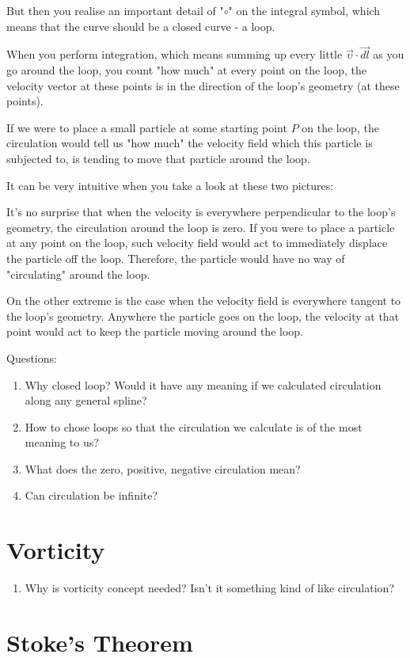 \documentclass[8pt, twocolumn]{extarticle}
\begin{document}
But then you realise an important detail of "$\circ$" on the integral symbol, which means that the curve should be a closed curve - a loop.

When you perform integration, which means summing up every little $\vec{\upsilon} \cdot \vec{dl}$ as you go around the loop, you count "how much" at every point on the loop, the velocity vector at these points is in the direction of the loop's geometry (at these points).

If we were to place a small particle at some starting point $P$ on the loop, the circulation would tell us "how much" the velocity field which this particle is subjected to, is tending to move that particle around the loop.

It can be very intuitive when you take a look at these two pictures:



It's no surprise that when the velocity is everywhere perpendicular to the loop's geometry, the circulation around the loop is zero. If you were to place a particle at any point on the loop, such velocity field would act to immediately displace the particle off the loop. Therefore, the particle would have no way of "circulating" around the loop.

On the other extreme is the case when the velocity field is everywhere tangent to the loop's geometry. Anywhere the particle goes on the loop, the velocity at that point would act to keep the particle moving around the loop.

Questions:

\begin{enumerate}
\item Why closed loop? Would it have any meaning if we calculated circulation along any general spline?

\item How to chose loops so that the circulation we calculate is of the most meaning to us?

\item What does the zero, positive, negative circulation mean?

\item Can circulation be infinite?
\end{enumerate}


\section{Vorticity}


\begin{enumerate}
\item Why is vorticity concept needed? Isn't it something kind of like circulation?

\end{enumerate}




\section{Stoke's Theorem}


\newpage

\begin{thebibliography}{50}



\end{thebibliography}
\end{document}
